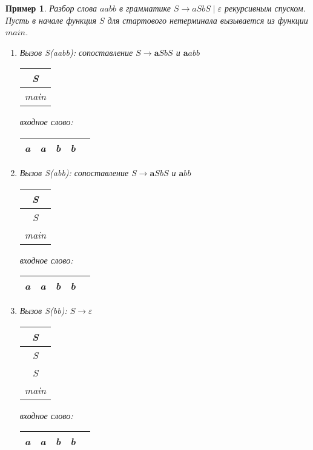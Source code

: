 \documentclass[10pt]{article}         %
\newtheorem{example}{Пример}
\begin{document}
	\begin{example}
		Разбор слова $aabb$ в грамматике $S \rightarrow aSbS \mid \varepsilon$ рекурсивным спуском. Пусть в начале функция $S$ для стартового нетерминала вызывается из функции $main$.
		
		\begin{enumerate}
			
			\item Вызов S(aabb): сопоставление $S \rightarrow \textbf{a}SbS$ и $\textbf{a}abb$
			
			\begin{tabular}[c]{ |c| } 
				\\ \hline
				S \\ \hline
				main \\ \hline
			\end{tabular}  
			\qquad  \qquad \qquad  \qquad входное слово: \,
			\begin{tabular}[c]{ |c|c|c|c|c| } 
				\hline
				\textbf{a} & a & b & b \\ \hline
			\end{tabular}

			
			\item Вызов S(abb): сопоставление $S \rightarrow \textbf{a}SbS$ и $\textbf{a}bb$
			
			\begin{tabular}[c]{ |c| } 
				\\ \hline
				S \\ \hline
				S \\ \hline
				main \\ \hline
			\end{tabular}  
			\qquad  \qquad \qquad  \qquad входное слово: \,
			\begin{tabular}[c]{ |c|c|c|c|c| } 
				\hline
				a & \textbf{a} & b & b \\ \hline
			\end{tabular}			
			
			\item Вызов S(bb): $S \rightarrow \varepsilon$
			
			\begin{tabular}[c]{ |c| } 
				\\ \hline
				S \\ \hline
				S \\ \hline
				S \\ \hline
				main \\ \hline
			\end{tabular}  
			\qquad  \qquad \qquad  \qquad входное слово: \,
			\begin{tabular}[c]{ |c|c|c|c|c| } 
				\hline
				a & \textbf{a} & b & b \\ \hline
			\end{tabular}
			

\end{enumerate}
\end{example}
\end{document}
